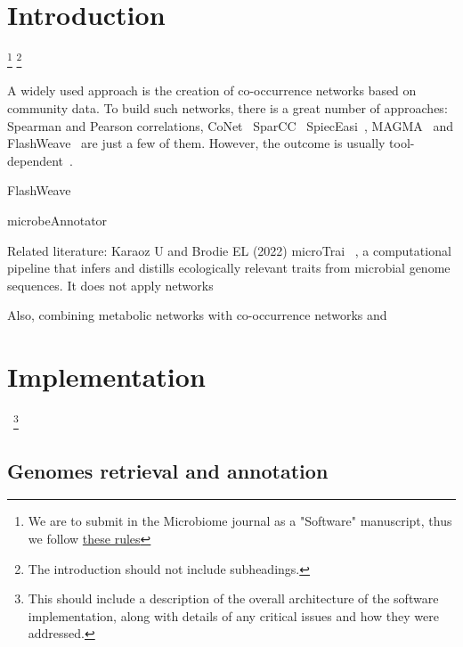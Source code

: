 \documentclass[sn-mathphys,Numbered]{sn-jnl}%
\theoremstyle{thmstyleone}%
\theoremstyle{thmstyletwo}%
\theoremstyle{thmstylethree}%
\begin{document}
\section{Introduction}
\label{sec1}
\footnote{We are to submit in the Microbiome journal as a "Software" manuscript, thus we follow 
\href{https://microbiomejournal.biomedcentral.com/submission-guidelines/preparing-your-manuscript/software-article}{these rules}}
\footnote{The introduction should not include subheadings.}

    A widely used approach is the creation of co-occurrence networks based on community data. To build such networks, there is a great number of approaches: Spearman and Pearson correlations, CoNet~\cite{faust2012microbial} SparCC~\cite{friedman2012inferring} SpiecEasi~\cite{kurtz2015sparse}, MAGMA~\cite{cougoul2019magma} and FlashWeave~\cite{flashweave_cite} are just a few of them.
    However, the outcome is usually tool-dependent~\cite{kishore2023inferring, weiss2016correlation, rottjers2018hairballs}. 

    FlashWeave 

    microbeAnnotator~\cite{ruiz2021microbeannotator} 


    Related literature:
    Karaoz U and Brodie EL (2022) microTrai~\cite{karaoz2022microtrait} , a computational pipeline that infers and distills ecologically relevant traits from microbial genome sequences.
    It does not apply networks

    Also, combining metabolic networks with co-occurrence networks 
    \cite{zelezniak2015metabolic}
    and
    \cite{levy2013metabolic}





\section{Implementation}~\footnote{This should include a description of the overall architecture of the software implementation, along with details of any critical issues and how they were addressed.}
    \label{sec:implementation}

    \subsection*{ Genomes retrieval and annotation }
        \label{subsec:genomes}
\end{document}

